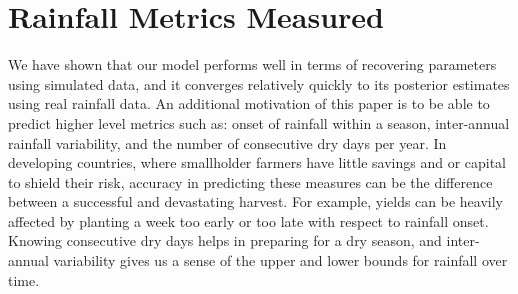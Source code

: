 \documentclass[12pt]{article}
\begin{document}







\section{Rainfall Metrics Measured}
\label{sec:metrics}

We have shown that our model performs well in terms of recovering parameters using simulated data, and it converges relatively quickly to its posterior estimates using real rainfall data. An additional motivation of this paper is to be able to predict higher level metrics such as: onset of rainfall within a season, inter-annual rainfall variability, and the number of consecutive dry days per year. In developing countries, where smallholder farmers have little savings and or capital to shield their risk, accuracy in predicting these measures can be the difference between a successful and devastating harvest. For example, yields can be heavily affected by planting a week too early or too late with respect to rainfall onset. Knowing consecutive dry days helps in preparing for a dry season, and inter-annual variability gives us a sense of the upper and lower bounds for rainfall over time. 
\end{document}
